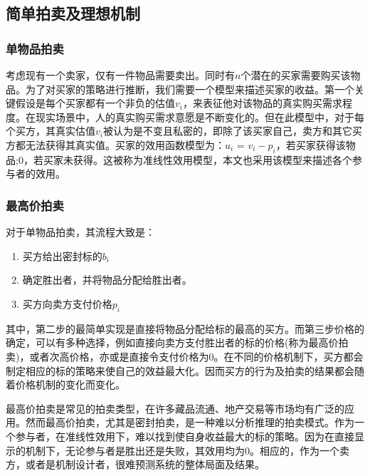 \documentclass[promaster]{thesis-uestc}
\begin{document}
\subsection{简单拍卖及理想机制}
\subsubsection{单物品拍卖}
考虑现有一个卖家，仅有一件物品需要卖出。同时有$n$个潜在的买家需要购买该物品。为了对买家的策略进行推断，我们需要一个模型来描述买家的收益。第一个关键假设是每个买家都有一个非负的估值$v_i$，来表征他对该物品的真实购买需求程度。在现实场景中，人的真实购买需求意愿是不断变化的。但在此模型中，对于每个买方，其真实估值$v_i$被认为是不变且私密的，即除了该买家自己，卖方和其它买方都无法获得其真实值。买家的效用函数模型为：$u_i$ = $v_i-p_i$，若买家获得该物品;$0$，若买家未获得。这被称为准线性效用模型，本文也采用该模型来描述各个参与者的效用。
\subsubsection{最高价拍卖}
对于单物品拍卖，其流程大致是：

\begin{enumerate}
    \item 买方给出密封标的$b_i$
    \item 确定胜出者，并将物品分配给胜出者。
    \item 买方向卖方支付价格$p_i$
\end{enumerate} 

其中，第二步的最简单实现是直接将物品分配给标的最高的买方。而第三步价格的确定，可以有多种选择，例如直接向卖方支付胜出者的标的价格(称为最高价拍卖)，或者次高价格，亦或是直接令支付价格为0。在不同的价格机制下，买方都会制定相应的标的策略来使自己的效益最大化。因而买方的行为及拍卖的结果都会随着价格机制的变化而变化。

最高价拍卖是常见的拍卖类型，在许多藏品流通、地产交易等市场均有广泛的应用。然而最高价拍卖，尤其是密封拍卖，是一种难以分析推理的拍卖模式。作为一个参与者，在准线性效用下，难以找到使自身收益最大的标的策略。因为在直接显示的机制下，无论参与者是胜出还是失败，其效用均为0。相应的，作为一个卖方，或者是机制设计者，很难预测系统的整体局面及结果。
\end{document}
